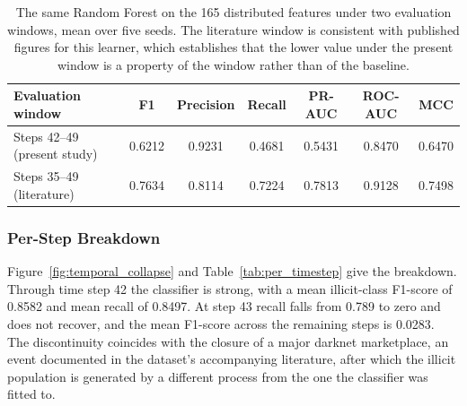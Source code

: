 \documentclass[12pt,a4paper]{article}
\begin{document}
\begin{table}[htbp]
\centering
\small
\caption{The same Random Forest on the 165 distributed features
under two evaluation windows, mean over five seeds. The
literature window is consistent with published figures for this
learner, which establishes that the lower value under the present
window is a property of the window rather than of the baseline.}
\label{tab:protocol_comparison}
\begin{tabular}{lcccccc}
\toprule
Evaluation window & F1 & Precision & Recall & PR-AUC & ROC-AUC & MCC \\
\midrule
Steps 42--49 (present study) & 0.6212 & 0.9231 & 0.4681 & 0.5431 & 0.8470 & 0.6470 \\
Steps 35--49 (literature)    & 0.7634 & 0.8114 & 0.7224 & 0.7813 & 0.9128 & 0.7498 \\
\bottomrule
\end{tabular}
\end{table}

\subsubsection{Per-Step Breakdown}

Figure~\ref{fig:temporal_collapse} and
Table~\ref{tab:per_timestep} give the breakdown. Through time
step 42 the classifier is strong, with a mean illicit-class
F1-score of 0.8582 and mean recall of 0.8497. At step 43 recall
falls from 0.789 to zero and does not recover, and the mean
F1-score across the remaining steps is 0.0283. The discontinuity
coincides with the closure of a major darknet marketplace, an
event documented in the dataset's accompanying literature, after
which the illicit population is generated by a different process
from the one the classifier was fitted to.
\end{document}
